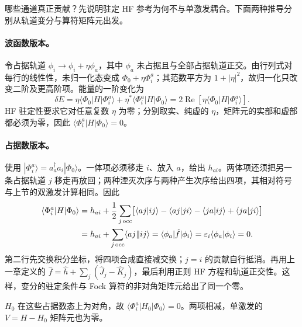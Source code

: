 哪些通道真正贡献？先说明驻定 HF 参考为何不与单激发耦合。下面两种推导分别从轨道变分与算符矩阵元出发。

\paragraph{波函数版本。}
令占据轨道 $\phi_i\to\phi_i+\eta\phi_a$，其中 $\phi_a$ 未占据且与全部占据轨道正交。由行列式对每行的线性性，未归一化态变成 $\Phi_0+\eta\Phi_i^a$；其范数平方为 $1+|\eta|^2$，故归一化只改变二阶及更高阶项。能量的一阶变化为
\begin{equation}
\delta E=\eta\langle\Phi_0|H|\Phi_i^a\rangle
+\eta^*\langle\Phi_i^a|H|\Phi_0\rangle
=2\operatorname{Re}\!\left[\eta\langle\Phi_0|H|\Phi_i^a\rangle\right].
\end{equation}
HF 驻定性要求它对任意复数 $\eta$ 为零；分别取实、纯虚的 $\eta$，矩阵元的实部和虚部都必须为零，因此 $\langle\Phi_i^a|H|\Phi_0\rangle=0$。

\paragraph{占据数版本。}
使用 $|\Phi_i^a\rangle=a_a^\dagger a_i|\Phi_0\rangle$。一体项必须移走 $i$、放入 $a$，给出 $h_{ai}$。两体项还须把另一条占据轨道 $j$ 移走再放回；两种湮灭次序与两种产生次序给出四项，其相对符号与上节的双激发计算相同。因此
\begin{align}
\langle\Phi_i^a|H|\Phi_0\rangle
&=h_{ai}+\frac12\sum_{j\,\mathrm{occ}}
\bigl[\langle aj|ij\rangle-\langle aj|ji\rangle
-\langle ja|ij\rangle+\langle ja|ji\rangle\bigr]\notag\\
&=h_{ai}+\sum_{j\,\mathrm{occ}}\langle aj\Vert ij\rangle
=\langle\phi_a|\hat f|\phi_i\rangle
=\varepsilon_i\langle\phi_a|\phi_i\rangle=0.
\end{align}
第二行先交换积分坐标，将四项合成直接减交换；$j=i$ 的贡献自行抵消。再用上一章定义的 $\hat f=\hat h+\sum_j(\hat J_j-\hat K_j)$，最后利用正则 HF 方程和轨道正交性。这样，变分的驻定条件与 Fock 算符的非对角矩阵元给出了同一个零。

$H_0$ 在这些占据数态上为对角，故 $\langle\Phi_i^a|H_0|\Phi_0\rangle=0$。两项相减，单激发的 $V=H-H_0$ 矩阵元也为零。

